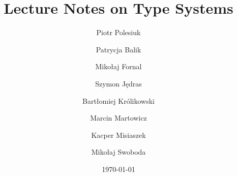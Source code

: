\documentclass[a4paper]{book}
\title{Lecture Notes on Type Systems}
\author{
  Piotr Polesiuk \and
  Patrycja Balik \and
  Mikołaj Fornal \and
  Szymon Jędras \and
  Bartłomiej Królikowski \and
  Marcin Martowicz \and
  Kacper Misiaszek \and
  Mikołaj Swoboda
}
\date{\today}
\begin{document}
  \frontmatter
  \maketitle
  ~\vfill
  \doclicenseThis
  \tableofcontents
%  

  \mainmatter
  
  
  
  
  
  
  
  
  
  
  
  
  
  

  
\end{document}
